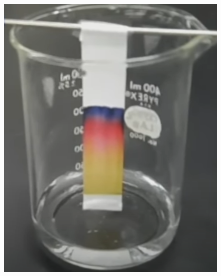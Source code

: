 \documentclass[withoutpreface]{cumcmthesis}
\begin{document}
\begin{figure}[!htbp]
    \centering
    \begin{minipage}[c]{0.48\textwidth}
        \centering
        \includegraphics[height=0.3\textheight]{figures/纸层析法.png}
    \end{minipage}
    \begin{minipage}[c]{0.48\textwidth}
        \centering

\end{minipage}
\end{figure}
\end{document}
